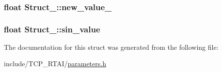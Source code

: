 \label{structStruct__2_a49587eb5408782fe456d674f11c7f8d8}
\hypertarget{structStruct__2_adde82146aff2eb87c780b77e071b39ed}{
\subsubsection[{new\_\-value\_\-4}]{\setlength{\rightskip}{0pt plus 5cm}float {\bf Struct\_::new\_\-value\_}}}
\label{structStruct__2_adde82146aff2eb87c780b77e071b39ed}
\hypertarget{structStruct__2_a145706c6b472fdaafa62e2b4b8da5888}{
\subsubsection[{sin\_\-value}]{\setlength{\rightskip}{0pt plus 5cm}float {\bf Struct\_::sin\_\-value}}}
\label{structStruct__2_a145706c6b472fdaafa62e2b4b8da5888}


The documentation for this struct was generated from the following file:\begin{DoxyCompactItemize}
\item 
include/TCP\_\-RTAI/\hyperlink{include_2TCP__RTAI_2parameters_8h}{parameters.h}\end{DoxyCompactItemize}
